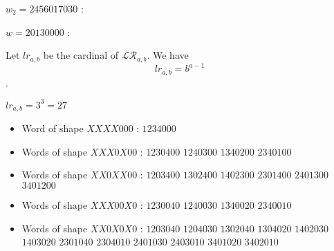 \begin{example}[$a > b : a = 7, b = 3$]
       $w_2 = 2456017030$ :\\
    
\end{example}

\begin{example}[$a < b : a = 3, b = 5$]
    $w = 20130000$ :\\
    
\end{example}

\begin{theorem}
    Let $lr_{a,b}$ be the cardinal of $\mathcal{LR}_{a,b}$.
    We have $$lr_{a,b} = b^{a - 1}$$.
\end{theorem}

\begin{example}[$a > b : a = 4, b = 3$]
    $lr_{a,b} = 3^3 = 27$
    \begin{itemize}
        \item Word of shape $XXXX000$ :
            \subitem $1234000$
        \item Words of shape $XXX0X00$ :
            \subitem $1230400$
            \hspace{2cm} $1240300$
            \hspace{2cm} $1340200$
            \subitem $2340100$
        \item Words of shape $XX0XX00$ :
            \subitem $1203400$
            \hspace{2cm} $1302400$
            \hspace{2cm} $1402300$
            \subitem $2301400$
            \hspace{2cm} $2401300$
            \hspace{2cm} $3401200$
        \item Words of shape $XXX00X0$ :
            \subitem $1230040$
            \hspace{2cm} $1240030$
            \hspace{2cm} $1340020$
            \subitem $2340010$
        \item Words of shape $XX0X0X0$ :
            \subitem $1203040$
            \hspace{2cm} $1204030$
            \hspace{2cm} $1302040$
            \subitem $1304020$
            \hspace{2cm} $1402030$
            \hspace{2cm} $1403020$
            \subitem $2301040$
            \hspace{2cm} $2304010$
            \hspace{2cm} $2401030$
            \subitem $2403010$
            \hspace{2cm} $3401020$
            \hspace{2cm} $3402010$
    \end{itemize}
    
\end{example}

